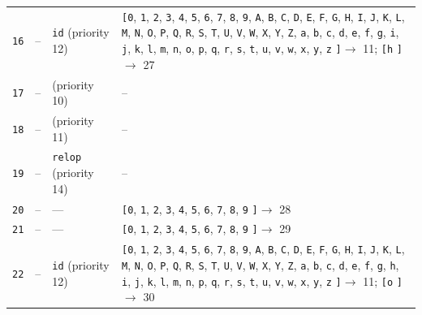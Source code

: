 \documentclass[11pt,a4paper]{article}
\newcommand{\opensymbolset}{\texttt{[}}
\newcommand{\closesymbolset}{\texttt{]}}
\begin{document}
\begin{landscape}
\begin{longtable}{
    >{\centering\arraybackslash}p{0.8cm}
    >{\centering\arraybackslash}p{0.7cm}
    >{\raggedright\arraybackslash}p{3.7cm}
    >{\raggedright\arraybackslash}p{18.1cm}
}
\texttt{16} & -- & \texttt{id} (priority 12) & \opensymbolset \texttt{0}, \texttt{1}, \texttt{2}, \texttt{3}, \texttt{4}, \texttt{5}, \texttt{6}, \texttt{7}, \texttt{8}, \texttt{9}, \texttt{A}, \texttt{B}, \texttt{C}, \texttt{D}, \texttt{E}, \texttt{F}, \texttt{G}, \texttt{H}, \texttt{I}, \texttt{J}, \texttt{K}, \texttt{L}, \texttt{M}, \texttt{N}, \texttt{O}, \texttt{P}, \texttt{Q}, \texttt{R}, \texttt{S}, \texttt{T}, \texttt{U}, \texttt{V}, \texttt{W}, \texttt{X}, \texttt{Y}, \texttt{Z}, \texttt{a}, \texttt{b}, \texttt{c}, \texttt{d}, \texttt{e}, \texttt{f}, \texttt{g}, \texttt{i}, \texttt{j}, \texttt{k}, \texttt{l}, \texttt{m}, \texttt{n}, \texttt{o}, \texttt{p}, \texttt{q}, \texttt{r}, \texttt{s}, \texttt{t}, \texttt{u}, \texttt{v}, \texttt{w}, \texttt{x}, \texttt{y}, \texttt{z} \closesymbolset $\to$ 11; \opensymbolset \texttt{h} \closesymbolset $\to$ 27 \\
\texttt{17} & -- & \texttt{\char123{}} (priority 10) & -- \\
\texttt{18} & -- & \texttt{\char125{}} (priority 11) & -- \\
\texttt{19} & -- & \texttt{relop} (priority 14) & -- \\
\texttt{20} & -- & --- & \opensymbolset \texttt{0}, \texttt{1}, \texttt{2}, \texttt{3}, \texttt{4}, \texttt{5}, \texttt{6}, \texttt{7}, \texttt{8}, \texttt{9} \closesymbolset $\to$ 28 \\
\texttt{21} & -- & --- & \opensymbolset \texttt{0}, \texttt{1}, \texttt{2}, \texttt{3}, \texttt{4}, \texttt{5}, \texttt{6}, \texttt{7}, \texttt{8}, \texttt{9} \closesymbolset $\to$ 29 \\
\texttt{22} & -- & \texttt{id} (priority 12) & \opensymbolset \texttt{0}, \texttt{1}, \texttt{2}, \texttt{3}, \texttt{4}, \texttt{5}, \texttt{6}, \texttt{7}, \texttt{8}, \texttt{9}, \texttt{A}, \texttt{B}, \texttt{C}, \texttt{D}, \texttt{E}, \texttt{F}, \texttt{G}, \texttt{H}, \texttt{I}, \texttt{J}, \texttt{K}, \texttt{L}, \texttt{M}, \texttt{N}, \texttt{O}, \texttt{P}, \texttt{Q}, \texttt{R}, \texttt{S}, \texttt{T}, \texttt{U}, \texttt{V}, \texttt{W}, \texttt{X}, \texttt{Y}, \texttt{Z}, \texttt{a}, \texttt{b}, \texttt{c}, \texttt{d}, \texttt{e}, \texttt{f}, \texttt{g}, \texttt{h}, \texttt{i}, \texttt{j}, \texttt{k}, \texttt{l}, \texttt{m}, \texttt{n}, \texttt{p}, \texttt{q}, \texttt{r}, \texttt{s}, \texttt{t}, \texttt{u}, \texttt{v}, \texttt{w}, \texttt{x}, \texttt{y}, \texttt{z} \closesymbolset $\to$ 11; \opensymbolset \texttt{o} \closesymbolset $\to$ 30 \\

\end{longtable}
\end{landscape}
\end{document}
